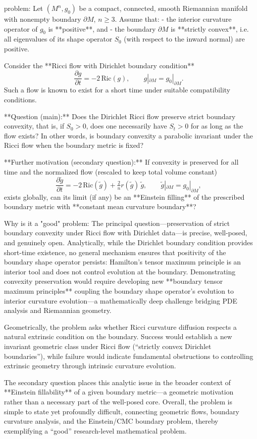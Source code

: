 problem:  
Let \( (M^n, g_0) \) be a compact, connected, smooth Riemannian manifold with nonempty boundary \( \partial M \), \( n \ge 3 \).  
Assume that:  
- the interior curvature operator of \(g_0\) is **positive**, and  
- the boundary \( \partial M \) is **strictly convex**, i.e. all eigenvalues of its shape operator \(S_0\) (with respect to the inward normal) are positive.

Consider the **Ricci flow with Dirichlet boundary condition**  
\[
\frac{\partial g}{\partial t} = -2\,\mathrm{Ric}(g), \qquad g|_{\partial M} = g_0|_{\partial M}.
\]
Such a flow is known to exist for a short time under suitable compatibility conditions.

**Question (main):**  
Does the Dirichlet Ricci flow preserve strict boundary convexity, that is, if \(S_0>0\), does one necessarily have \(S_t>0\) for as long as the flow exists?  
In other words, is boundary convexity a parabolic invariant under the Ricci flow when the boundary metric is fixed?

**Further motivation (secondary question):**  
If convexity is preserved for all time and the normalized flow (rescaled to keep total volume constant)
\[
\frac{\partial \tilde g}{\partial t}
   = -2\,\mathrm{Ric}(\tilde g)
     + \tfrac{2}{n}r(\tilde g)\,\tilde g, 
   \qquad \tilde g|_{\partial M}=g_0|_{\partial M},
\]
exists globally, can its limit (if any) be an **Einstein filling** of the prescribed boundary metric with **constant mean curvature boundary**?

Why is it a "good" problem:  
The principal question—preservation of strict boundary convexity under Ricci flow with Dirichlet data—is precise, well-posed, and genuinely open. Analytically, while the Dirichlet boundary condition provides short-time existence, no general mechanism ensures that positivity of the boundary shape operator persists: Hamilton’s tensor maximum principle is an interior tool and does not control evolution at the boundary. Demonstrating convexity preservation would require developing new **boundary tensor maximum principles** coupling the boundary shape operator’s evolution to interior curvature evolution—a mathematically deep challenge bridging PDE analysis and Riemannian geometry.

Geometrically, the problem asks whether Ricci curvature diffusion respects a natural extrinsic condition on the boundary. Success would establish a new invariant geometric class under Ricci flow (“strictly convex Dirichlet boundaries”), while failure would indicate fundamental obstructions to controlling extrinsic geometry through intrinsic curvature evolution.

The secondary question places this analytic issue in the broader context of **Einstein fillability** of a given boundary metric—a geometric motivation rather than a necessary part of the well-posed core.  Overall, the problem is simple to state yet profoundly difficult, connecting geometric flows, boundary curvature analysis, and the Einstein/CMC boundary problem, thereby exemplifying a “good” research-level mathematical problem.